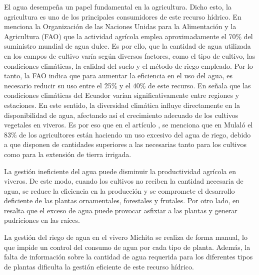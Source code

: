 El agua desempeña un papel fundamental en la agricultura. Dicho esto, la agricultura es uno de los principales consumidores de este recurso hídrico. En \cite{noauthor_gestion_2018} menciona la Organización de las Naciones Unidas para la Alimentación y la Agricultura (FAO) que la actividad agrícola emplea aproximadamente el 70\% del suministro mundial de agua dulce. Es por ello, que la cantidad de agua utilizada en los campos de cultivo varía según diversos factores, como el tipo de cultivo, las condiciones climáticas,
la calidad del suelo y el método de riego empleado. Por lo tanto, la FAO \cite{noauthor_gestion_2018} indica que para aumentar la eficiencia en el uso del agua, es necesario reducir su uso entre el 25\% y el 40\% de este recurso.
\bigbreak
En \cite{temperatura_nodate} señala que las condiciones climáticas del Ecuador varían significativamente entre regiones y estaciones. En este sentido, la diversidad climática influye directamente en la disponibilidad de agua, afectando así el crecimiento adecuado de los cultivos vegetales en viveros. Es por eso que en el artículo \cite{c_estudio_2018}, se menciona que en Mulaló el 83\% de los agricultores están haciendo un uso excesivo del agua de riego, debido a que disponen de cantidades superiores a las necesarias tanto para los cultivos como para la extensión de tierra irrigada.

\bigbreak
La gestión ineficiente del agua puede disminuir la productividad agrícola en viveros. De este modo, cuando los cultivos no reciben la cantidad necesaria de agua, se reduce la eficiencia en la producción y se compromete el desarrollo deficiente de las plantas ornamentales, forestales y frutales. Por otro lado, en \cite{luz_cultivo_2014} resalta que el exceso de agua puede provocar asfixiar a las plantas y generar pudriciones en las raíces.

\bigbreak
La gestión del riego de agua en el vivero Michita se realiza de forma manual, lo que impide un control del consumo de agua por cada tipo de planta. Además, la falta de información  sobre la cantidad de agua requerida para los diferentes tipos de plantas dificulta la gestión eficiente de este recurso hídrico. 
